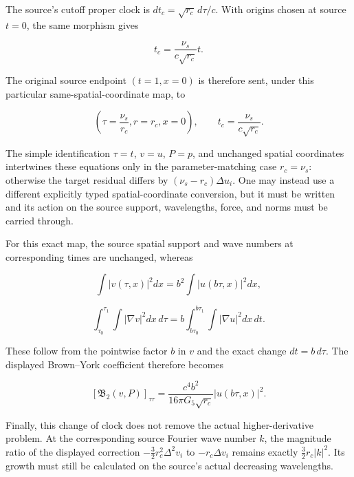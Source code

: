 The source's cutoff proper clock is \(dt_c=\sqrt{r_c}\,d\tau/c\). With
origins chosen at source \(t=0\), the same morphism gives

\[
t_c=\frac{\nu_s}{c\sqrt{r_c}}t.
\]

The original source endpoint \((t=1,x=0)\) is therefore sent, under this
particular same-spatial-coordinate map, to

\[
\left(\tau=\frac{\nu_s}{r_c},r=r_c,x=0\right),
\qquad t_c=\frac{\nu_s}{c\sqrt{r_c}}.
\]

The simple identification \(\tau=t\), \(v=u\), \(P=p\), and unchanged
spatial coordinates intertwines these equations only in the
parameter-matching case \(r_c=\nu_s\): otherwise the target residual
differs by \((\nu_s-r_c)\Delta u_i\). One may instead use a different
explicitly typed spatial-coordinate conversion, but it must be written
and its action on the source support, wavelengths, force, and norms must
be carried through.

For this exact map, the source spatial support and wave numbers at
corresponding times are unchanged, whereas

\[
\int |v(\tau,x)|^2dx=b^2\int|u(b\tau,x)|^2dx,
\]

\[
\int_{\tau_0}^{\tau_1}\int|\nabla v|^2dx\,d\tau
=b\int_{b\tau_0}^{b\tau_1}\int|\nabla u|^2dx\,dt.
\]

These follow from the pointwise factor \(b\) in \(v\) and the exact
change \(dt=b\,d\tau\). The displayed Brown--York coefficient therefore
becomes

\[
[\mathfrak B_2(v,P)]_{\tau\tau}
=\frac{c^4b^2}{16\pi G_5\sqrt{r_c}}|u(b\tau,x)|^2.
\]

Finally, this change of clock does not remove the actual
higher-derivative problem. At the corresponding source Fourier wave
number \(k\), the magnitude ratio of the displayed correction
\(-\tfrac32r_c^2\Delta^2v_i\) to \(-r_c\Delta v_i\) remains exactly
\(\tfrac32r_c|k|^2\). Its growth must still be calculated on the
source's actual decreasing wavelengths.
